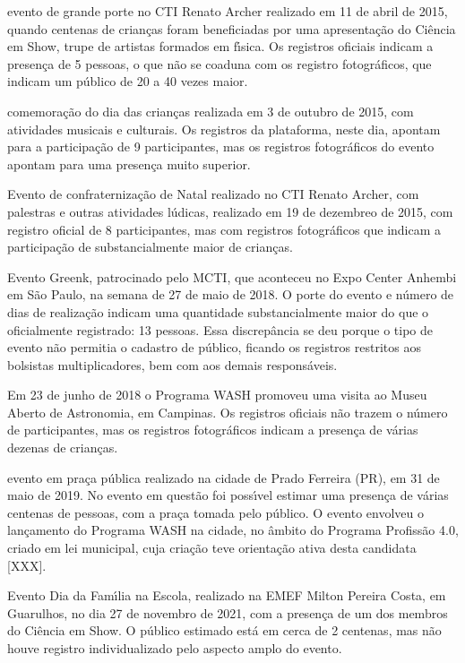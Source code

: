 \documentclass[
12pt,		%
openright,	%
twoside,  %
a4paper,			%
chapter=TITLE,		%
english,			%
french,				%
spanish,			%
brazil				%
]{USPSC-classe/USPSC_RedarTex}
\begin{document}
\begin{alineas}
\item evento de grande porte no CTI Renato Archer realizado em 11 de abril de 2015, quando centenas de crian\c{c}as foram beneficiadas por uma apresenta\c{c}\~ao do Ci\^encia em Show, trupe de artistas formados em f\'{\i}sica. Os registros oficiais indicam a presen\c{c}a de 5 pessoas, o que n\~ao se coaduna com os registro fotogr\'aficos, que indicam um p\'ublico de 20 a 40 vezes maior.
\item comemora\c{c}\~ao do dia das crian\c{c}as realizada em 3 de outubro de 2015, com atividades musicais e culturais. Os registros da plataforma, neste dia, apontam para a participa\c{c}\~ao de 9 participantes, mas os registros fotogr\'aficos do evento apontam para uma presen\c{c}a muito superior.
\item Evento de confraterniza\c{c}\~ao de Natal realizado no CTI Renato Archer, com palestras e outras atividades l\'udicas, realizado em 19 de dezembreo de 2015, com registro oficial de 8 participantes, mas com registros fotogr\'aficos que indicam a participa\c{c}\~ao de substancialmente maior de crian\c{c}as.
\item Evento Greenk, patrocinado pelo MCTI, que aconteceu no Expo Center Anhembi em S\~ao Paulo, na semana de 27 de maio de 2018. O porte do evento e n\'umero de dias de realiza\c{c}\~ao indicam uma quantidade substancialmente maior do que o oficialmente registrado: 13 pessoas. Essa discrep\^ancia se deu porque o tipo de evento n\~ao permitia o cadastro de p\'ublico, ficando os registros restritos aos bolsistas multiplicadores, bem com aos demais respons\'aveis.
\item Em 23 de junho de 2018 o Programa WASH promoveu uma visita ao Museu Aberto de Astronomia, em Campinas. Os registros oficiais n\~ao trazem o n\'umero de participantes, mas os registros fotogr\'aficos indicam a presen\c{c}a de v\'arias dezenas de crian\c{c}as.
\item evento em pra\c{c}a p\'ublica realizado na cidade de Prado Ferreira (PR), em 31 de maio de 2019. No evento em quest\~ao foi poss\'{\i}vel estimar uma presen\c{c}a de v\'arias centenas de pessoas, com a pra\c{c}a tomada pelo p\'ublico. O evento envolveu o lan\c{c}amento do Programa WASH na cidade, no \^ambito do Programa Profiss\~ao 4.0, criado em lei municipal, cuja cria\c{c}\~ao teve orienta\c{c}\~ao ativa desta candidata [XXX].
\item Evento Dia da Fam\'{\i}lia na Escola, realizado na EMEF Milton Pereira Costa, em Guarulhos, no dia 27 de novembro de 2021, com a presen\c{c}a de um dos membros do Ci\^encia em Show. O p\'ublico estimado est\'a em cerca de 2 centenas, mas n\~ao houve registro individualizado pelo aspecto amplo do evento.
\end{alineas}
\end{document}
